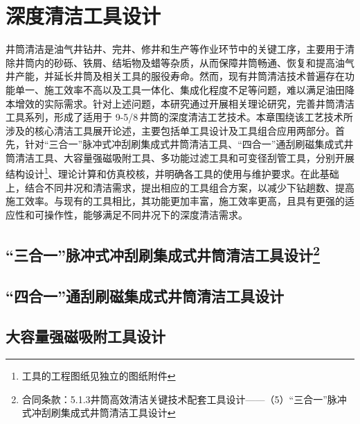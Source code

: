 \documentclass[12pt, a4paper, zihao=-4, openright]{ctexrep}
\newcommand{\inch}{\,\text{''}} %
\begin{document}
\chapter{深度清洁工具设计}

井筒清洁是油气井钻井、完井、修井和生产等作业环节中的关键工序，主要用于清除井筒内的砂砾、铁屑、结垢物及蜡等杂质，从而保障井筒畅通、恢复和提高油气井产能，并延长井筒及相关工具的服役寿命。然而，现有井筒清洁技术普遍存在功能单一、施工效率不高以及工具一体化、集成化程度不足等问题，难以满足油田降本增效的实际需求。针对上述问题，本研究通过开展相关理论研究，完善井筒清洁工具系列，形成了适用于 9-5/8\inch 井筒的深度清洁工艺技术。本章围绕该工艺技术所涉及的核心清洁工具展开论述，主要包括单工具设计及工具组合应用两部分。首先，针对“三合一”脉冲式冲刮刷集成式井筒清洁工具、“四合一”通刮刷磁集成式井筒清洁工具、大容量强磁吸附工具、多功能过滤工具和可变径刮管工具，分别开展结构设计\footnote{工具的工程图纸见独立的图纸附件}、理论计算和仿真校核，并明确各工具的使用与维护要求。在此基础上，结合不同井况和清洁需求，提出相应的工具组合方案，以减少下钻趟数、提高施工效率。与现有的工具相比，其功能更加丰富，施工效率更高，且具有更强的适应性和可操作性，能够满足不同井况下的深度清洁需求。

\section[“三合一”脉冲式冲刮刷集成式井筒清洁工具设计]{“三合一”脉冲式冲刮刷集成式井筒清洁工具设计\protect\footnote{合同条款：5.1.3井筒高效清洁关键技术配套工具设计——（5）“三合一”脉冲式冲刮刷集成式井筒清洁工具设计}}\label{sec:design_of_3_in_1}\label{sanheyi}
	
	
	
	
	
\section{“四合一”通刮刷磁集成式井筒清洁工具设计}\label{siheyi}
	
  
	
\section{大容量强磁吸附工具设计}
	
  
\end{document}
